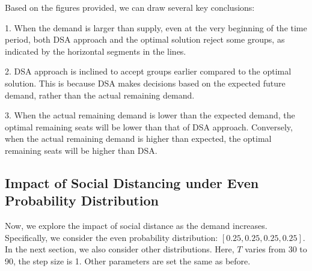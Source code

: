 Based on the figures provided, we can draw several key conclusions:

1. When the demand is larger than supply, even at the very beginning of the time period, both DSA approach and the optimal solution reject some groups, as indicated by the horizontal segments in the lines.

2. DSA approach is inclined to accept groups earlier compared to the optimal solution. This is because DSA makes decisions based on the expected future demand, rather than the actual remaining demand.

3. When the actual remaining demand is lower than the expected demand, the optimal remaining seats will be lower than that of DSA approach. Conversely, when the actual remaining demand is higher than expected, the optimal remaining seats will be higher than DSA.


\subsection{Impact of Social Distancing under Even Probability Distribution}
Now, we explore the impact of social distance as the demand increases. Specifically, we consider the even probability distribution: $[0.25, 0.25, 0.25, 0.25]$. In the next section, we also consider other 
distributions. Here, $T$ varies from 30 to 90, the step size is 1. Other parameters are set the same as before.


